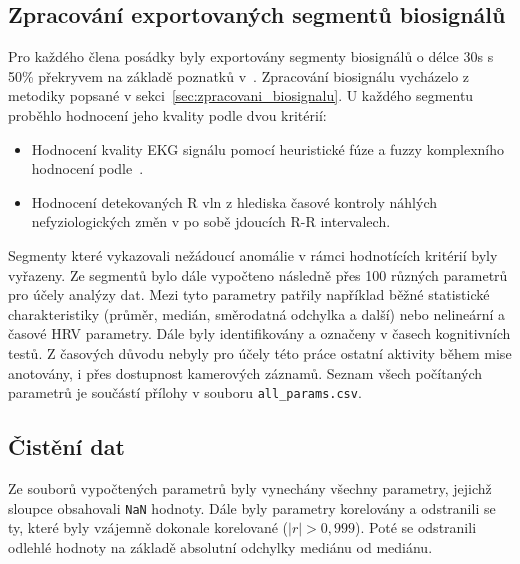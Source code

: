 \subsection{Zpracování exportovaných segmentů biosignálů}
\label{subsec:prezpracovani_segmentu}
Pro každého člena posádky byly exportovány segmenty biosignálů o délce 30s s
50\% překryvem na základě poznatků
v~\cite{Castaldo2019,Kim2021,Pecchia2018,Shaffer2020,Tervonen2021}. Zpracování
biosignálu vycházelo z metodiky popsané v sekci~\ref{sec:zpracovani_biosignalu}.
U každého segmentu proběhlo hodnocení jeho kvality podle dvou kritérií:
\begin{itemize}
      \item Hodnocení kvality \gls{EKG} signálu pomocí heuristické fúze a fuzzy
            komplexního hodnocení podle~\cite{Zhao2018}.
      \item Hodnocení detekovaných R vln z hlediska časové kontroly náhlých
            nefyziologických změn v po sobě jdoucích R-R intervalech.
\end{itemize}
Segmenty které vykazovali nežádoucí anomálie v rámci hodnotících kritérií byly
vyřazeny. Ze segmentů bylo dále vypočteno následně přes 100 různých parametrů
pro účely analýzy dat. Mezi tyto parametry patřily například běžné statistické
charakteristiky (průměr, medián, směrodatná odchylka a další) nebo nelineární a
časové \gls{HRV} parametry. Dále byly identifikovány a označeny v časech
kognitivních testů. Z časových důvodu nebyly pro účely této práce ostatní
aktivity během mise anotovány, i přes dostupnost kamerových záznamů. Seznam
všech počítaných parametrů je součástí přílohy v souboru
\texttt{all\_params.csv}. 

\subsection{Čistění dat}
\label{subsec:cisteni_dat}
Ze souborů vypočtených parametrů byly vynechány všechny parametry, jejichž
sloupce obsahovali \texttt{NaN} hodnoty. Dále byly parametry korelovány a
odstranili se ty, které byly vzájemně dokonale korelované ($|r| > 0,999$). Poté
se odstranili odlehlé hodnoty na základě absolutní odchylky mediánu od mediánu.

